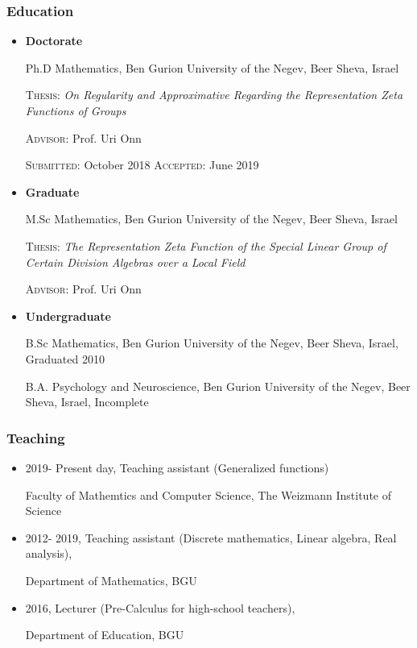 \documentclass[leqno,10pt]{article}
\begin{document}
\subsubsection*{Education}
\begin{itemize}
\item\textbf{Doctorate}

Ph.D Mathematics, Ben Gurion University of the Negev, Beer Sheva, Israel

\textsc{Thesis}:\textit{ On Regularity and Approximative Regarding the Representation Zeta Functions of Groups}

 \textsc{Advisor}: Prof. Uri Onn
 
 
\textsc{Submitted}: October 2018 \quad\textsc{Accepted}: June 2019
\item\textbf{Graduate}

M.Sc Mathematics, Ben Gurion University of the Negev, Beer Sheva, Israel

\textsc{Thesis}:\textit{ The Representation Zeta Function of the Special Linear Group of Certain Division Algebras over a Local Field}

\textsc{Advisor}: Prof. Uri Onn


\item\textbf{Undergraduate}

B.Sc Mathematics, Ben Gurion University of the Negev, Beer Sheva, Israel, Graduated 2010%

B.A. Psychology and Neuroscience, Ben Gurion University of the Negev, Beer Sheva, Israel, Incomplete%


\end{itemize}

\subsubsection*{Teaching}
\begin{itemize}
\item 2019- Present day, Teaching assistant (Generalized functions)

Faculty of Mathemtics and Computer Science, The Weizmann Institute of Science
\item 2012- 2019, Teaching assistant (Discrete mathematics, Linear algebra, Real analysis),

Department of Mathematics, BGU


\item 2016, Lecturer (Pre-Calculus for high-school teachers),

Department of Education, BGU
\end{itemize}
\end{document}
